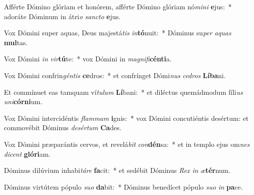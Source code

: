 \item Afférte Dómino glóriam et honórem, afférte Dómino glóriam nó\textit{mi}\textit{ni} \textbf{e}jus:~* adoráte Dóminum in átri\textit{o} \textit{sanc}\textit{to} \textbf{e}jus.
\item Vox Dómini super aquas, Deus majestá\textit{tis} \textit{in}\textbf{tó}nuit:~* Dóminus su\textit{per} \textit{a}\textit{quas} \textbf{mul}tas.
\item Vox Dómini \textit{in} \textit{vir}\textbf{tú}te:~* vox Dómini in \textit{ma}\textit{gni}\textit{fi}\textbf{cén}\textbf{ti}a.
\item Vox Dómini confrin\textit{gén}\textit{tis} \textbf{ce}dros:~* et confrínget Dómi\textit{nus} \textit{ce}\textit{dros} \textbf{Lí}\textbf{ba}ni.
\item Et commínuet eas tamquam ví\textit{tu}\textit{lum} \textbf{Lí}bani:~* et diléctus quemádmodum fíli\textit{us} \textit{u}\textit{ni}\textbf{cór}\textbf{ni}um.
\item Vox Dómini intercidéntis \textit{flam}\textit{mam} \textbf{i}gnis:~* vox Dómini concutiéntis desértum: et commovébit Dóminus \textit{de}\textit{sér}\textit{tum} \textbf{Ca}des.
\item Vox Dómini præparántis cervos, et revelá\textit{bit} \textit{con}\textbf{dén}sa:~* et in templo ejus om\textit{nes} \textit{di}\textit{cent} \textbf{gló}\textbf{ri}am.
\item Dóminus dilúvium inhabi\textit{tá}\textit{re} \textbf{fa}cit:~* et sedébit Dóminus \textit{Rex} \textit{in} \textit{æ}\textbf{tér}num.
\item Dóminus virtútem pópulo \textit{su}\textit{o} \textbf{da}bit:~* Dóminus benedícet pópulo \textit{su}\textit{o} \textit{in} \textbf{pa}ce.

